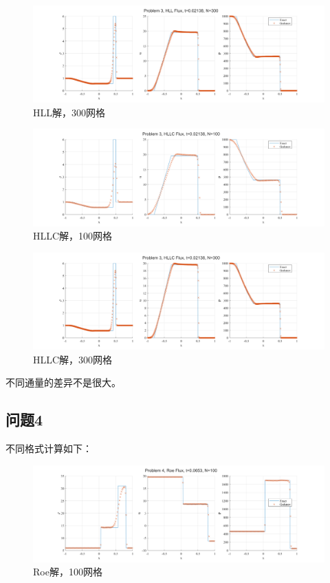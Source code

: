 \documentclass[UTF8,zihao=5]{ctexart} %
\begin{document}
\begin{figure}[H]
    \centering
    \includegraphics[width=18cm]{p3_HLL_N300.png}  %
    \caption{HLL解，300网格}
\end{figure}

\begin{figure}[H]
    \centering
    \includegraphics[width=18cm]{p3_HLLC_N100.png}  %
    \caption{HLLC解，100网格}
\end{figure}

\begin{figure}[H]
    \centering
    \includegraphics[width=18cm]{p3_HLLC_N300.png}  %
    \caption{HLLC解，300网格}
\end{figure}

不同通量的差异不是很大。

\subsection{问题4}

不同格式计算如下：

\begin{figure}[H]
    \centering
    \includegraphics[width=18cm]{p4_Roe_N100.png}  %
    \caption{Roe解，100网格}
\end{figure}
\end{document}
